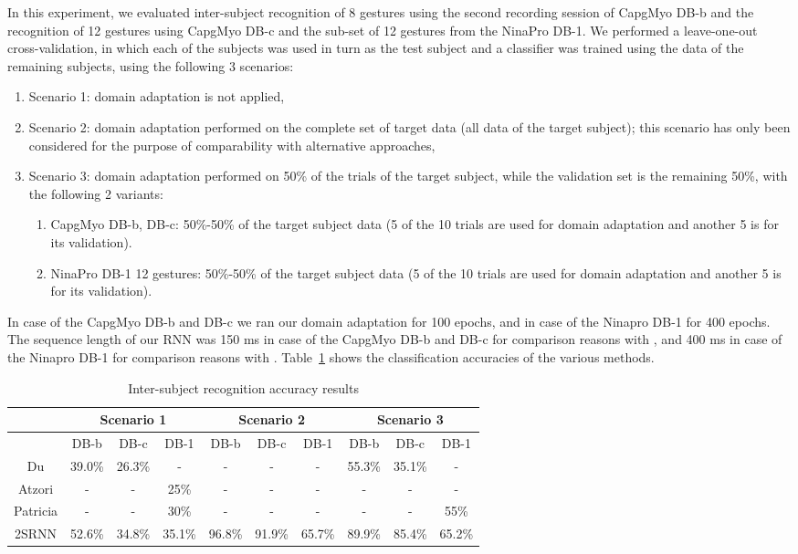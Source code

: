 \documentclass[conference]{IEEEtran}
\begin{document}
In this experiment,
we evaluated inter-subject recognition of 8 gestures using the second recording session of CapgMyo DB-b and the recognition of 12 gestures using CapgMyo DB-c and the sub-set of 12 gestures from the NinaPro DB-1.
We performed a leave-one-out cross-validation,
in which each of the subjects was used in turn as the test subject and a classifier was trained using the data of the remaining subjects, using the following 3 scenarios:
\begin{enumerate}
	\item Scenario 1: domain adaptation is not applied,
	\item Scenario 2: domain adaptation performed on the complete set of target data (all data of the target subject); this scenario has only been considered for the purpose of comparability with alternative approaches,
	\item Scenario 3: domain adaptation performed on 50\% of the trials of the target subject, while the validation set is the remaining 50\%, with the following 2 variants:
	\begin{enumerate}
		\item CapgMyo DB-b, DB-c: 50\%-50\% of the target subject data (5 of the 10 trials are used for domain adaptation and another 5 is for its validation).
		\item NinaPro DB-1 12 gestures: 50\%-50\% of the target subject data (5 of the 10 trials are used for domain adaptation and another 5 is for its validation).
	\end{enumerate}
\end{enumerate}
In case of the CapgMyo DB-b and DB-c we ran our domain adaptation for 100 epochs, and in case of the Ninapro DB-1 for 400 epochs.
The sequence length of our RNN was 150 ms in case of the CapgMyo DB-b and DB-c for comparison reasons with \cite{b18}, and 400 ms in case of the Ninapro DB-1 for comparison reasons with \cite{b7}.
Table~\ref{table:inter-subject} shows the classification accuracies of the various methods.
\begin{table}[tpb]
	\centering
	\begin{threeparttable}
		\setlength{\tabcolsep}{1pt}
		\def\arraystretch{1.5}\begin{tabular}{|c|c|c|c|c|c|c|c|c|c|} 
			\hline
			& \multicolumn{3}{|c|}{Scenario 1} & \multicolumn{3}{|c|}{Scenario 2} & \multicolumn{3}{|c|}{Scenario 3} \\
			\hline
			& DB-b & DB-c & DB-1 & DB-b & DB-c & DB-1 & DB-b & DB-c & DB-1 \\
			Du\cite{b18} & 39.0\% & 26.3\% & - & - & - & - & 55.3\% & 35.1\% & - \\
			Atzori\cite{b23} & - & - & 25\% & - & - & - & - & - & -\\
			Patricia\cite{b7} & - & - & 30\% & - & - & - & - & - & 55\% \\
			2SRNN & 52.6\% & 34.8\% & 35.1\% & 96.8\% & 91.9\% & 65.7\% & 89.9\% & 85.4\% & 65.2\% \\
			\hline
		\end{tabular}
		\caption{Inter-subject recognition accuracy results}
		\label{table:inter-subject}
	\end{threeparttable}
\end{table}
\end{document}
